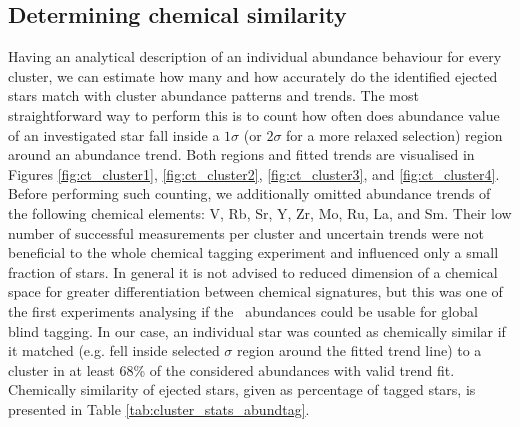 \subsection{Determining chemical similarity}
\label{sec:chem_ej_tag}
Having an analytical description of an individual abundance behaviour for every cluster, we can estimate how many and how accurately do the identified ejected stars match with cluster abundance patterns and trends. The most straightforward way to perform this is to count how often does abundance value of an investigated star fall inside a $1\sigma$ (or $2\sigma$ for a more relaxed selection) region around an abundance trend. Both regions and fitted trends are visualised in Figures \ref{fig:ct_cluster1}, \ref{fig:ct_cluster2}, \ref{fig:ct_cluster3}, and \ref{fig:ct_cluster4}. Before performing such counting, we additionally omitted abundance trends of the following chemical elements: V, Rb, Sr, Y, Zr, Mo, Ru, La, and Sm. Their low number of successful measurements per cluster and uncertain trends were not beneficial to the whole chemical tagging experiment and influenced only a small fraction of stars. In general it is not advised to reduced dimension of a chemical space for greater differentiation between chemical signatures, but this was one of the first experiments analysing if the \Gh\ abundances could be usable for global blind tagging. In our case, an individual star was counted as chemically similar if it matched (e.g. fell inside selected $\sigma$ region around the fitted trend line) to a cluster in at least $68$\% of the considered abundances with valid trend fit. Chemically similarity of ejected stars, given as percentage of tagged stars, is presented in Table \ref{tab:cluster_stats_abundtag}.

